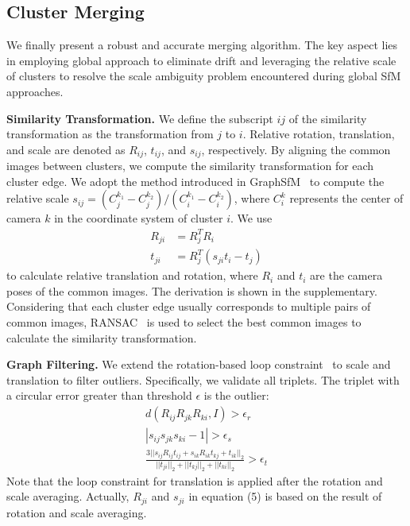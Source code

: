\documentclass[runningheads]{llncs}
\begin{document}
\subsection{Cluster Merging}

We finally present a robust and accurate merging algorithm. The key aspect lies in employing global approach to eliminate drift and leveraging the relative scale of clusters to resolve the scale ambiguity problem encountered during global SfM approaches.

\textbf{Similarity Transformation.} We define the subscript $ij$ of the similarity transformation as the transformation from $j$ to $i$. Relative rotation, translation, and scale are denoted as $R_{ij}$, $t_{ij}$, and $s_{ij}$, respectively. By aligning the common images between clusters, we compute the similarity transformation for each cluster edge. We adopt the method introduced in GraphSfM~\cite{gsfm} to compute the relative scale $s_{ij} = {(C_j^{k_1} - C_j^{k_2})} / {(C_i^{k_1} - C_i^{k_2})}$, where $C_i^k$ represents the center of camera $k$ in the coordinate system of cluster $i$. We use 
\begin{align}
R_{ji} &= R_{j}^TR_i \\ 
t_{ji} &= R_{j}^T(s_{ji}t_{i} - t_{j})
\end{align} 
to calculate relative translation and rotation, where $R_{i}$ and $t_{i}$ are the camera poses of the common images. The derivation is shown in the supplementary. Considering that each cluster edge usually corresponds to multiple pairs of common images, RANSAC~\cite{RANSAC} is used to select the best common images to calculate the similarity transformation. 


\textbf{Graph Filtering.} We extend the rotation-based loop constraint~\cite{loop} to scale and translation to filter outliers. Specifically, we validate all triplets. The triplet with a circular error greater than threshold $\epsilon$ is the outlier:
\begin{align}
d(R_{ij}R_{jk}R_{ki},I) > \epsilon_r \\ 
|s_{ij}s_{jk}s_{ki} - 1| > \epsilon_s \\
\frac {3 || s_{ij}R_{ij}t_{ij} + s_{ik}R_{ik}t_{kj} + t_{ik} ||_2} {||t_{ji}||_2+||t_{kj}||_2+||t_{ki}||_2} > \epsilon_t
\end{align} 
Note that the loop constraint for translation is applied after the rotation and scale averaging. Actually, $R_{ji}$ and $s_{ji}$ in equation (5) is based on the result of rotation and scale averaging.
\end{document}
